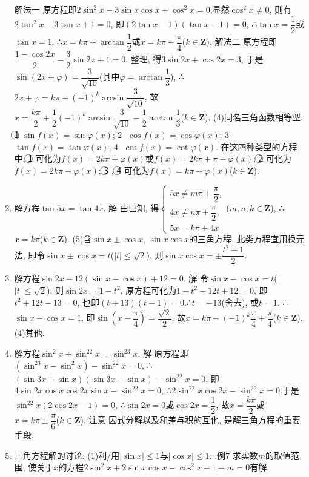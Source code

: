 \documentclass[10pt,a4paper]{article}
\begin{document}
\begin{enumerate}[1.]
解法一  原方程即$2\sin ^2x-3\sin x\cos x+\cos ^2x=0$.显然$\cos ^2x\ne 0$,
则有$2\tan ^2x-3\tan x+1=0$, 即$(2\tan x-1)(\tan x-1)=0$,
∴$\tan x=\dfrac 12$或$\tan x=1$, ∴$x=k\pi +\arctan \dfrac 12$或$x=k\pi +\dfrac{\pi }4$($k\in \mathbf{Z}$).
解法二  原方程即$\dfrac{1-\cos 2x}2-\dfrac 32\sin 2x+1=0$.
整理, 得$3\sin 2x+\cos 2x=3$, 于是$\sin (2x+\varphi)=\dfrac 3{\sqrt {10}}$(其中$\varphi =\arctan \dfrac 13$),
∴$2x+\varphi =k\pi +(-1)^k\arcsin \dfrac 3{\sqrt {10}}$,
故$x=\dfrac{k\pi }2+\dfrac 12(-1)^k\arcsin \dfrac 3{\sqrt {10}}-\dfrac 12\arctan \dfrac 13$($k\in \mathbf{Z}$).
(4)同名三角函数相等型.
\textcircled{1} $\sin f(x)=\sin \varphi (x)$; \textcircled{2} $\cos f(x)=\cos \varphi (x)$; \textcircled{3} $\tan f(x)=\tan \varphi (x)$; \textcircled{4} $\cot f(x)=\cot \varphi (x)$.
在这四种类型的方程中, \textcircled{1} 可化为$f(x)=2k\pi +\varphi (x)$或$f(x)=2k\pi +\pi -\varphi (x)$; \textcircled{2} 可化为$f(x)=2k\pi \pm \varphi (x)$; \textcircled{3} , \textcircled{4} 可化为$f(x)=k\pi +\varphi (x)$($k\in \mathbf{Z}$).
\item 解方程$\tan 5x=\tan 4x$.
解  由已知, 得$\begin{cases} 5x\ne m\pi +\dfrac{\pi }2, \\ 4x\ne n\pi +\dfrac{\pi }2, \\ 5x=k\pi +4x \end{cases}$($m,n,k\in \mathbf{Z}$), ∴$x=k\pi$($k\in \mathbf{Z}$).
(5)含$\sin x\pm \cos x$, $\sin x\cos x$的三角方程.
此类方程宜用换元法, 即令$\sin x\pm \cos x=t$($|t|\le \sqrt 2$), 则$\sin x\cos x=\pm \dfrac{t^2-1}2$.
\item 解方程$\sin 2x-12(\sin x-\cos x)+12=0$.
解  令$\sin x-\cos x=t$($|t|\le \sqrt 2$), 则$\sin 2x=1-t^2$, 原方程可化为$1-t^2-12t+12=0$,
即$t^2+12t-13=0$, 也即$(t+13)(t-1)=0$.∴$t=-13$(舍去), 或$t=1$.
∴$\sin x-\cos x=1$, 即$\sin (x-\dfrac{\pi }4)=\dfrac{\sqrt 2}2$, 故$x=k\pi +(-1)^k\dfrac{\pi }4+\dfrac{\pi }4$($k\in \mathbf{Z}$).
(4)其他.
\item 解方程$\sin ^2x+\sin ^22x=\sin ^23x$.
解  原方程即$(\sin ^23x-\sin ^2x)-\sin ^22x=0$,
∴$(\sin 3x+\sin x)(\sin 3x-\sin x)-\sin ^22x=0$, 即$4\sin 2x\cos x\cos 2x\sin x-\sin ^22x=0$,
∴$2\sin ^22x\cos 2x-\sin ^22x=0$.于是$\sin ^22x(2\cos 2x-1)=0$,
∴$\sin 2x=0$或$\cos 2x=\dfrac 12$, 故$x=\dfrac{k\pi }2$或$x=k\pi \pm \dfrac{\pi }6$($k\in \mathbf{Z}$).
注意  因式分解以及和差与积的互化, 是解三角方程的重要手段.
\item 三角方程解的讨论.
(1)利/用$|\sin x|\le 1$与$|\cos x|\le 1$.
.例7  求实数$m$的取值范围, 使关于$x$的方程$2\sin ^2x+2\sin x\cos x-\cos ^2x-1-m=0$有解.

\end{enumerate}
\end{document}
